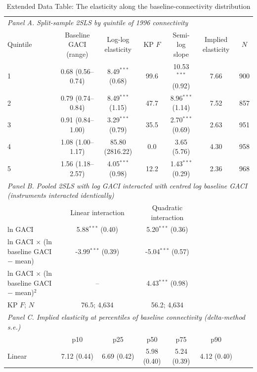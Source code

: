 \begin{table}[htbp]
\centering
\begin{threeparttable}
\caption{Extended Data Table: The elasticity along the baseline-connectivity distribution}
\label{tab:gradient}
\footnotesize
\begin{tabular}{lcccccc}
\toprule
\multicolumn{7}{l}{\textit{Panel A. Split-sample 2SLS by quintile of 1996 connectivity}} \\
Quintile & Baseline GACI (range) & Log-log elasticity & KP $F$ & Semi-log slope & Implied elasticity & $N$ \\
\midrule
  1 & 0.68 (0.56--0.74) & 8.49$^{***}$ (0.68) & 99.6 & 10.53$^{***}$ (0.92) & 7.66 & 900 \\
  2 & 0.79 (0.74--0.84) & 8.49$^{***}$ (1.15) & 47.7 & 8.96$^{***}$ (1.14) & 7.52 & 857 \\
  3 & 0.91 (0.84--1.00) & 3.29$^{***}$ (0.79) & 35.5 & 2.70$^{***}$ (0.69) & 2.63 & 951 \\
  4 & 1.08 (1.00--1.17) & 85.80 (2816.22) & 0.0 & 3.65 (5.76) & 4.30 & 958 \\
  5 & 1.56 (1.18--2.57) & 4.05$^{***}$ (0.98) & 12.2 & 1.43$^{***}$ (0.29) & 2.36 & 968 \\
\midrule
\multicolumn{7}{l}{\textit{Panel B. Pooled 2SLS with log GACI interacted with centred log baseline GACI (instruments interacted identically)}} \\
 & \multicolumn{2}{c}{Linear interaction} & \multicolumn{2}{c}{Quadratic interaction} & & \\
  ln GACI & \multicolumn{2}{c}{5.88$^{***}$ (0.40)} & \multicolumn{2}{c}{5.20$^{***}$ (0.36)} & & \\
  ln GACI $\times$ (ln baseline GACI $-$ mean) & \multicolumn{2}{c}{-3.99$^{***}$ (0.39)} & \multicolumn{2}{c}{-5.04$^{***}$ (0.57)} & & \\
  ln GACI $\times$ (ln baseline GACI $-$ mean)$^2$ & \multicolumn{2}{c}{--} & \multicolumn{2}{c}{4.43$^{***}$ (0.98)} & & \\
  KP $F$; $N$ & \multicolumn{2}{c}{76.5; 4,634} & \multicolumn{2}{c}{56.2; 4,634} & & \\
\midrule
\multicolumn{7}{l}{\textit{Panel C. Implied elasticity at percentiles of baseline connectivity (delta-method s.e.)}} \\
 & p10 & p25 & p50 & p75 & p90 & \\
  Linear & 7.12 (0.44) & 6.69 (0.42) & 5.98 (0.40) & 5.24 (0.39) & 4.12 (0.40) & \\

\end{tabular}
\end{threeparttable}
\end{table}
